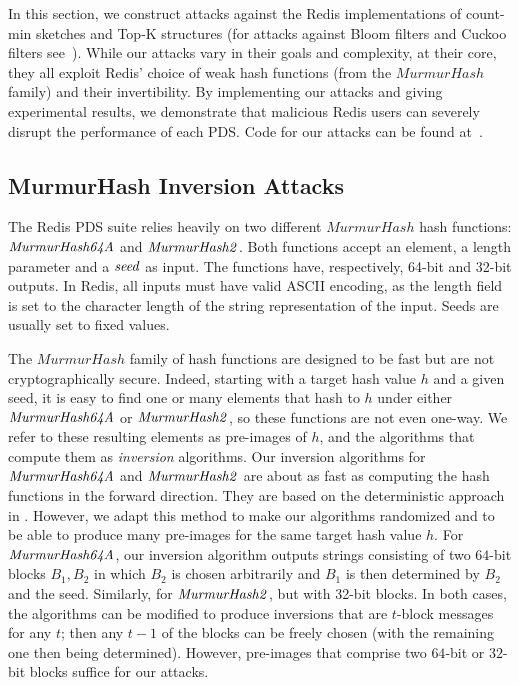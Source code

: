 In this section, we construct attacks against the Redis implementations of  count-min sketches and Top-K structures (for attacks against Bloom filters and Cuckoo filters see~\cite{cryptoeprint:2024/1312}). While our attacks vary in their goals and complexity, at their core, they all exploit Redis' choice of weak hash functions (from the $\mathit{MurmurHash}$ family) and their invertibility.
By implementing our attacks and giving experimental results, we demonstrate that malicious Redis users can severely disrupt the performance of each PDS. Code for our attacks can be found at~\cite{gitrepo}.

\subsection{MurmurHash Inversion Attacks}\label{sec:MurmurHash}
The Redis PDS suite relies heavily on two different $\mathit{MurmurHash}$ hash functions: $\mathit{MurmurHash64A}$ and $\mathit{MurmurHash2}$. Both functions accept an element, a length parameter and a $\mathit{seed}$ as input. The functions have, respectively, 64-bit and 32-bit outputs. In Redis, all inputs must have valid ASCII encoding, as the length field is set to the character length of the string representation of the input. Seeds are usually set to fixed values.

The $\mathit{MurmurHash}$ family of hash functions are designed to be fast but are not cryptographically secure. 
Indeed, starting with a target hash value $h$ and a given seed, it is easy to find one or many elements that hash to $h$ under either $\mathit{MurmurHash64A}$ or $\mathit{MurmurHash2}$, so these functions are not even one-way. 
We refer to these resulting elements as pre-images of $h$, and the algorithms that compute them as \emph{inversion} algorithms. %
Our inversion algorithms for $\mathit{MurmurHash64A}$ and $\mathit{MurmurHash2}$ are about as fast as computing the hash functions in the forward direction. They are based on the deterministic approach in \cite{murmurhash64Ainv}. However, we adapt this method to make our algorithms randomized and to be able to produce many pre-images for the same target hash value $h$. 
For $\mathit{MurmurHash64A}$, our inversion algorithm outputs strings consisting of two $64$-bit blocks $B_1, B_2$ in which $B_2$ is chosen arbitrarily and $B_1$ is then determined by $B_2$ and the seed. 
Similarly, for $\mathit{MurmurHash2}$, but with 32-bit blocks. 
In both cases, the algorithms can be modified to produce inversions that are $t$-block messages for any $t$; then any $t-1$ of the blocks can be freely chosen (with the remaining one then being determined). 
However, pre-images that comprise two $64$-bit or $32$-bit blocks suffice for our attacks.

